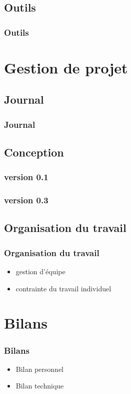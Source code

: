 \documentclass{beamer}
\begin{document}
		\subsection{Outils}
			\begin{frame}
				\frametitle{Outils}
			\end{frame}
			
			
	\section{Gestion de projet}
	
		\subsection{Journal}
			\begin{frame}
			  \frametitle{Journal}
			\end{frame}
			
		\subsection{Conception}
			\begin{frame}
				\frametitle{version 0.1}
			\end{frame}
			\begin{frame}
				\frametitle{version 0.3}
			\end{frame}
		
		\subsection{Organisation du travail}
			\begin{frame}
			  \frametitle{Organisation du travail}
			  \begin{itemize}
			    \item gestion d'équipe
			    \item contrainte du travail individuel
			  \end{itemize}
			\end{frame}
		
		
	\section{Bilans}
	  \begin{frame}
      \frametitle{Bilans}
		  \begin{itemize}
		    \item Bilan personnel
		    \item Bilan technique
		  \end{itemize}
	  \end{frame}
		

			
			
\end{document}
